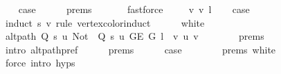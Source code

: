 \begin{isabellebody}
\ \ \isamarkupfalse%
\ {\isacharquery}{\kern0pt}case\isanewline
\ \ \ \ \isamarkupfalse%
\ {\isachardoublequoteopen}{}{\isachardot}{\kern0pt}prems{\isachardoublequoteclose}{\isacharparenleft}{\kern0pt}{}{\isacharcomma}{\kern0pt}\ {}{\isacharparenright}{\kern0pt}\isanewline
\ \ \ \ \isamarkupfalse%
\ fastforce\isanewline
{}\isamarkupfalse%
\isanewline
\ \ \isamarkupfalse%
\ {\isacharparenleft}{\kern0pt}{}\ v\ v{\isacharprime}{\kern0pt}\ l{\isacharparenright}{\kern0pt}\isanewline
\ \ \isamarkupfalse%
\ {\isacharquery}{\kern0pt}case\isanewline
\ \ \isamarkupfalse%
\ {\isacharparenleft}{\kern0pt}induct\ s\ v\ rule{\isacharcolon}{\kern0pt}\ vertex{\isacharunderscore}{\kern0pt}color{\isacharunderscore}{\kern0pt}induct{\isacharparenright}{\kern0pt}\isanewline
\ \ \ \ \isamarkupfalse%
\ white\isanewline
\ \ \ \ \isamarkupfalse%
\ {\isachardoublequoteopen}alt{\isacharunderscore}{\kern0pt}path\ {\isacharparenleft}{\kern0pt}Q\ s\ u{\isacharparenright}{\kern0pt}\ {\isacharparenleft}{\kern0pt}Not\ {\isasymcirc}\ Q\ s\ u{\isacharparenright}{\kern0pt}\ {\isacharparenleft}{\kern0pt}G{\isachardot}{\kern0pt}E\ G{\isacharparenright}{\kern0pt}\ {\isacharparenleft}{\kern0pt}l\ {\isacharat}{\kern0pt}\ {\isacharbrackleft}{\kern0pt}v{\isacharbrackright}{\kern0pt}{\isacharparenright}{\kern0pt}\ u\ v{\isachardoublequoteclose}\isanewline
\ \ \ \ \ \ \isamarkupfalse%
\ {\isachardoublequoteopen}{}{\isachardot}{\kern0pt}prems{\isachardoublequoteclose}{\isacharparenleft}{\kern0pt}{}{\isacharparenright}{\kern0pt}\isanewline
\ \ \ \ \ \ \isamarkupfalse%
\ {\isacharparenleft}{\kern0pt}intro\ alt{\isacharunderscore}{\kern0pt}path{\isacharunderscore}{\kern0pt}pref{\isacharparenright}{\kern0pt}\isanewline
\ \ \ \ \isamarkupfalse%
\ {\isachardoublequoteopen}{}{\isachardot}{\kern0pt}prems{\isachardoublequoteclose}{\isacharparenleft}{\kern0pt}{}{\isacharparenright}{\kern0pt}\isanewline
\ \ \ \ \isamarkupfalse%
\ {\isacharquery}{\kern0pt}case\isanewline
\ \ \ \ \ \ \isamarkupfalse%
\ {\isachardoublequoteopen}{}{\isachardot}{\kern0pt}prems{\isachardoublequoteclose}{\isacharparenleft}{\kern0pt}{}{\isacharparenright}{\kern0pt}\ white\isanewline
\ \ \ \ \ \ \isamarkupfalse%
\ {\isacharparenleft}{\kern0pt}force\ intro{\isacharcolon}{\kern0pt}\ {\isachardoublequoteopen}{}{\isachardot}{\kern0pt}hyps{\isachardoublequoteclose}{\isacharparenright}{\kern0pt}\isanewline

\end{isabellebody}
